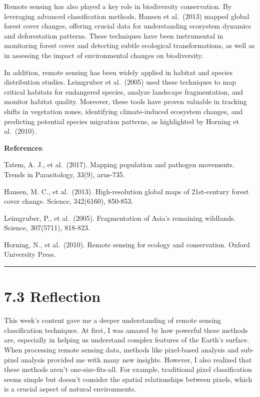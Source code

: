\documentclass[
  letterpaper,
  DIV=11,
  numbers=noendperiod]{scrreprt}
\begin{document}
Remote sensing has also played a key role in biodiversity conservation.
By leveraging advanced classification methods, Hansen et al.~(2013)
mapped global forest cover changes, offering crucial data for
understanding ecosystem dynamics and deforestation patterns. These
techniques have been instrumental in monitoring forest cover and
detecting subtle ecological transformations, as well as in assessing the
impact of environmental changes on biodiversity.

In addition, remote sensing has been widely applied in habitat and
species distribution studies. Leimgruber et al.~(2005) used these
techniques to map critical habitats for endangered species, analyze
landscape fragmentation, and monitor habitat quality. Moreover, these
tools have proven valuable in tracking shifts in vegetation zones,
identifying climate-induced ecosystem changes, and predicting potential
species migration patterns, as highlighted by Horning et al.~(2010).

\textbf{References}:

Tatem, A. J., et al.~(2017). Mapping population and pathogen movements.
Trends in Parasitology, 33(9), arus-735.

Hansen, M. C., et al.~(2013). High-resolution global maps of
21st-century forest cover change. Science, 342(6160), 850-853.

Leimgruber, P., et al.~(2005). Fragmentation of Asia's remaining
wildlands. Science, 307(5711), 818-823.

Horning, N., et al.~(2010). Remote sensing for ecology and conservation.
Oxford University Press.

\begin{center}\rule{0.5\linewidth}{0.5pt}\end{center}

\section{7.3 Reflection}\label{reflection-5}

This week's content gave me a deeper understanding of remote sensing
classification techniques. At first, I was amazed by how powerful these
methods are, especially in helping us understand complex features of the
Earth's surface. When processing remote sensing data, methods like
pixel-based analysis and sub-pixel analysis provided me with many new
insights. However, I also realized that these methods aren't
one-size-fits-all. For example, traditional pixel classification seems
simple but doesn't consider the spatial relationships between pixels,
which is a crucial aspect of natural environments.
\end{document}
